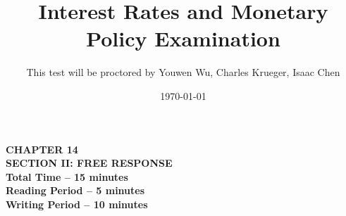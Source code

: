 

\setlength{\footskip}{1in}  %

\pagestyle{fancy}


\newcommand{\columnbreak}{{\par\vfill\null\pagebreak[4]}}


\title{Interest Rates and Monetary Policy Examination}
\author{This test will be proctored by Youwen Wu, Charles Krueger, Isaac Chen}
\date{\today}
\maketitle





\onecolumn
\begin{adjustwidth}{1in}{1in}
  \begin{center}
    \textbf{
      CHAPTER 14 \\
      \medskip
      SECTION II: FREE RESPONSE \\
      \medskip
      Total Time -- 15 minutes \\
      \medskip
      Reading Period -- 5 minutes \\
      \medskip
      Writing Period -- 10 minutes}
  \end{center}
\end{adjustwidth}

\bigskip


\onecolumn
\sffamily
\bfseries



\large
\printbibliography


